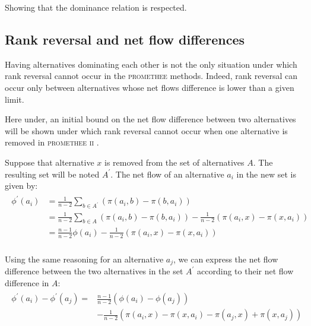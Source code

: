 Showing that the dominance relation is respected.

\subsection{Rank reversal and net flow differences}

Having alternatives dominating each other is not the only situation under which rank reversal cannot occur in the \textsc{promethee} methods.
Indeed, rank reversal can occur only between alternatives whose net flows difference is lower than a given limit.

Here under, an initial bound on the net flow difference between two alternatives will be shown under which rank reversal cannot occur when one alternative is removed in \textsc{promethee ii} \cite{DecisionEng}.

Suppose that alternative $x$ is removed from the set of alternatives $A$. The resulting set will be noted $A^{\prime}$. The net flow of an alternative $a_i$ in the new set is given by:
\begin{align}
    \begin{split}
        \phi^{\prime}(a_i) & =
            \frac{1}{n-2}\sum\limits_{b\in A^{\prime}} (\pi(a_i,b) - \pi(b, a_i)) \\
            & = \frac{1}{n-2}\sum\limits_{b\in A} (\pi(a_i,b) - \pi(b, a_i)) - \frac{1}{n-2}(\pi(a_i,x) - \pi(x,a_i))\\
            &= \frac{n-1}{n-2}\phi(a_i) - \frac{1}{n-2}(\pi(a_i,x) - \pi(x,a_i))\\
    \end{split}
    \label{eqn:phi_a_prime_using_phi_a}
\end{align}

Using the same reasoning for an alternative $a_j$, we can express the net flow difference between the two alternatives in the set $A^{\prime}$ according to their net flow difference in $A$:
\begin{align}
    \begin{split}
        \phi^{\prime}(a_i) - \phi^{\prime}(a_j)
             = & \frac{n-1}{n-2}(\phi(a_i) - \phi(a_j)) \\
                & - \frac{1}{n-2}(\pi(a_i,x) - \pi(x,a_i) - \pi(a_j,x) + \pi(x, a_j))\\
    \end{split}
    \label{eqn_phi_diff_prime_using_phi_diff}
\end{align}

